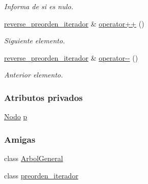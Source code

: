 \begin{DoxyCompactItemize}
\begin{DoxyCompactList}\small\item\em Informa de si es nulo. \end{DoxyCompactList}\item 
\hyperlink{classArbolGeneral_1_1reverse__preorden__iterador}{reverse\-\_\-preorden\-\_\-iterador} \& \hyperlink{classArbolGeneral_1_1reverse__preorden__iterador_a46a546c134ae2d7fe7bc41e16227eb1f}{operator++} ()
\begin{DoxyCompactList}\small\item\em Siguiente elemento. \end{DoxyCompactList}\item 
\hyperlink{classArbolGeneral_1_1reverse__preorden__iterador}{reverse\-\_\-preorden\-\_\-iterador} \& \hyperlink{classArbolGeneral_1_1reverse__preorden__iterador_abe501ae99cd71b927e21f882ec4bfec6}{operator-\/-\/} ()
\begin{DoxyCompactList}\small\item\em Anterior elemento. \end{DoxyCompactList}\end{DoxyCompactItemize}
\subsubsection*{Atributos privados}
\begin{DoxyCompactItemize}
\item 
\hyperlink{classArbolGeneral_a12cc1b74a9095d89bc7334290d332f7a}{Nodo} \hyperlink{classArbolGeneral_1_1reverse__preorden__iterador_a002862fdee453a84b037e5dd26c071a2}{p}
\end{DoxyCompactItemize}
\subsubsection*{Amigas}
\begin{DoxyCompactItemize}
\item 
class \hyperlink{classArbolGeneral_1_1reverse__preorden__iterador_a9c06e31b7c3e0d4ee5b03003d32935a5}{Arbol\-General}
\item 
class \hyperlink{classArbolGeneral_1_1reverse__preorden__iterador_a4aa0da8bfbc320a8daff98451ee65b6c}{preorden\-\_\-iterador}
\end{DoxyCompactItemize}


